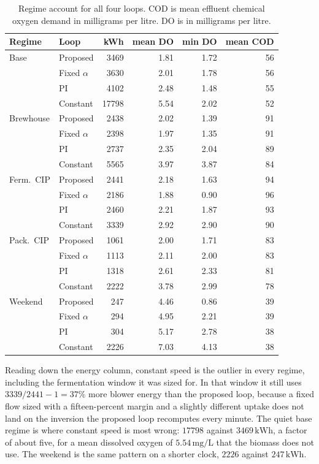 \begin{table}[ht]
\centering
\caption{Regime account for all four loops. COD is mean effluent chemical oxygen demand in milligrams per litre. DO is in milligrams per litre.}
\label{tab:allreg}
\scriptsize
\begin{tabular}{@{}llrrrr@{}}
\toprule
Regime & Loop & kWh & mean DO & min DO & mean COD \\
\midrule
Base & Proposed & 3469 & 1.81 & 1.72 & 56 \\
 & Fixed $\alpha$ & 3630 & 2.01 & 1.78 & 56 \\
 & PI & 4102 & 2.48 & 1.48 & 55 \\
 & Constant & 17798 & 5.54 & 2.02 & 52 \\
Brewhouse & Proposed & 2438 & 2.02 & 1.39 & 91 \\
 & Fixed $\alpha$ & 2398 & 1.97 & 1.35 & 91 \\
 & PI & 2737 & 2.35 & 2.04 & 89 \\
 & Constant & 5565 & 3.97 & 3.87 & 84 \\
Ferm.\ CIP & Proposed & 2441 & 2.18 & 1.63 & 94 \\
 & Fixed $\alpha$ & 2186 & 1.88 & 0.90 & 96 \\
 & PI & 2460 & 2.21 & 1.87 & 93 \\
 & Constant & 3339 & 2.92 & 2.90 & 90 \\
Pack.\ CIP & Proposed & 1061 & 2.00 & 1.71 & 83 \\
 & Fixed $\alpha$ & 1113 & 2.11 & 2.00 & 83 \\
 & PI & 1318 & 2.61 & 2.33 & 81 \\
 & Constant & 2222 & 3.78 & 2.99 & 78 \\
Weekend & Proposed & 247 & 4.46 & 0.86 & 39 \\
 & Fixed $\alpha$ & 294 & 4.95 & 2.21 & 39 \\
 & PI & 304 & 5.17 & 2.78 & 38 \\
 & Constant & 2226 & 7.03 & 4.13 & 38 \\
\bottomrule
\end{tabular}
\end{table}

Reading down the energy column, constant speed is the outlier in every regime, including the fermentation window it was sized for. In that window it still uses $3339/2441-1=37\%$ more blower energy than the proposed loop, because a fixed flow sized with a fifteen-percent margin and a slightly different uptake does not land on the inversion the proposed loop recomputes every minute. The quiet base regime is where constant speed is most wrong: $17798$ against $3469\,\mathrm{kWh}$, a factor of about five, for a mean dissolved oxygen of $5.54\,\mathrm{mg/L}$ that the biomass does not use. The weekend is the same pattern on a shorter clock, $2226$ against $247\,\mathrm{kWh}$.

